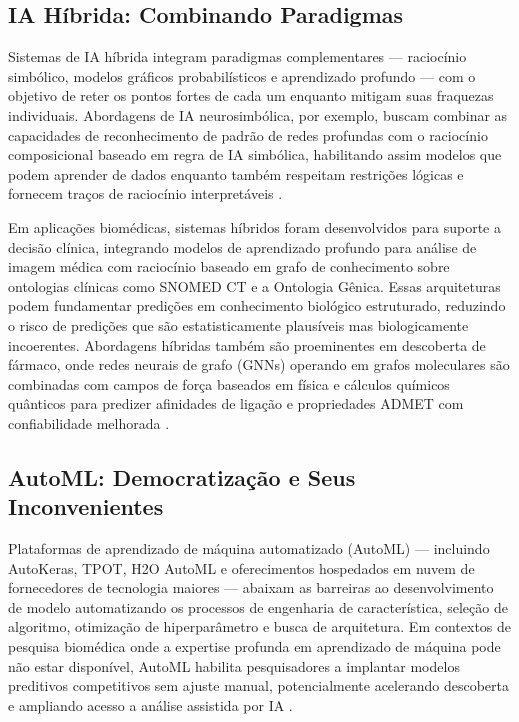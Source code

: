 \subsection{IA Híbrida: Combinando Paradigmas}

Sistemas de IA híbrida integram paradigmas complementares --- raciocínio simbólico, modelos gráficos probabilísticos e aprendizado profundo --- com o objetivo de reter os pontos fortes de cada um enquanto mitigam suas fraquezas individuais. Abordagens de IA neurosimbólica, por exemplo, buscam combinar as capacidades de reconhecimento de padrão de redes profundas com o raciocínio composicional baseado em regra de IA simbólica, habilitando assim modelos que podem aprender de dados enquanto também respeitam restrições lógicas e fornecem traços de raciocínio interpretáveis \parencite{marcus2019, garcez2023}.

Em aplicações biomédicas, sistemas híbridos foram desenvolvidos para suporte a decisão clínica, integrando modelos de aprendizado profundo para análise de imagem médica com raciocínio baseado em grafo de conhecimento sobre ontologias clínicas como SNOMED CT e a Ontologia Gênica. Essas arquiteturas podem fundamentar predições em conhecimento biológico estruturado, reduzindo o risco de predições que são estatisticamente plausíveis mas biologicamente incoerentes. Abordagens híbridas também são proeminentes em descoberta de fármaco, onde redes neurais de grafo (GNNs) operando em grafos moleculares são combinadas com campos de força baseados em física e cálculos químicos quânticos para predizer afinidades de ligação e propriedades ADMET com confiabilidade melhorada \parencite{wieder2020}.

\subsection{AutoML: Democratização e Seus Inconvenientes}

Plataformas de aprendizado de máquina automatizado (AutoML) --- incluindo AutoKeras, TPOT, H2O AutoML e oferecimentos hospedados em nuvem de fornecedores de tecnologia maiores --- abaixam as barreiras ao desenvolvimento de modelo automatizando os processos de engenharia de característica, seleção de algoritmo, otimização de hiperparâmetro e busca de arquitetura. Em contextos de pesquisa biomédica onde a expertise profunda em aprendizado de máquina pode não estar disponível, AutoML habilita pesquisadores a implantar modelos preditivos competitivos sem ajuste manual, potencialmente acelerando descoberta e ampliando acesso a análise assistida por IA \parencite{he2021}.

